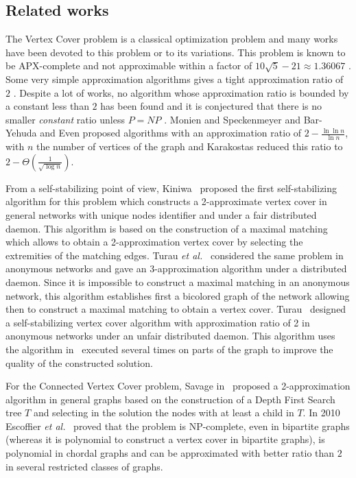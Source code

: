 \documentclass[11pt,letterpaper,onecolumn]{article}
\begin{document}
\subsection{Related works}

The Vertex Cover problem is a classical optimization problem and many works have been devoted to this problem or to its variations. This problem is known to be APX-complete \cite{PapadimitriouY88} and not approximable within a factor of $10\sqrt{5}-21\approx 1.36067$ \cite{DinurS05}. Some very simple approximation algorithms gives a tight approximation ratio of $2$ \cite{GJ79,Vaz01,Savage82}. Despite a lot of works, no algorithm whose approximation ratio is bounded by a constant less than $2$ has been found and it is conjectured that there is no smaller \emph{constant} ratio unless $P=NP$ \cite{KhotR08}. Monien and Speckenmeyer \cite{Monien1985} and Bar-Yehuda and Even \cite{Bar-YehudaE85} proposed algorithms with an approximation ratio of $2-\frac{\ln \ln n}{\ln n}$, with $n$ the number of vertices of the graph and Karakostas \cite{Karakostas05} reduced this ratio to $2-\Theta (\frac{1}{\sqrt{\log{n}}})$.

From a self-stabilizing point of view, Kiniwa~\cite{Kiniwa05} proposed the first self-stabilizing algorithm for this problem which constructs a 2-approximate vertex cover in general networks with unique nodes identifier and under a fair distributed daemon. This algorithm is based on the construction of a maximal matching which allows to obtain a 2-approximation vertex cover by selecting the extremities of the matching edges. Turau \emph{et al.}~\cite{TurauH11} considered the same problem in anonymous networks and gave an 3-approximation algorithm under a distributed daemon. Since it is impossible to construct a maximal matching in an anonymous network, this algorithm establishes first a bicolored graph of the network allowing then to construct a maximal matching to obtain a vertex cover. Turau~\cite{Turau10} designed a self-stabilizing vertex cover algorithm with approximation ratio of 2 in anonymous networks under an unfair distributed daemon. This algorithm uses the algorithm in~\cite{TurauH11} executed several times on parts of the graph to improve the quality of the constructed solution.

For the Connected Vertex Cover problem, Savage in~\cite{Savage82} proposed a 2-approximation algorithm in general graphs based on the construction of a Depth First Search tree $T$ and selecting in the solution the nodes with at least a child in $T$. In 2010 Escoffier \emph{et al.}~\cite{EscoffierGouvesMonnot10} proved that the problem is NP-complete, even in bipartite graphs (whereas it is polynomial to construct a vertex cover in bipartite graphs), is polynomial in chordal graphs and can be approximated with better ratio than $2$ in several restricted classes of graphs.
\end{document}
